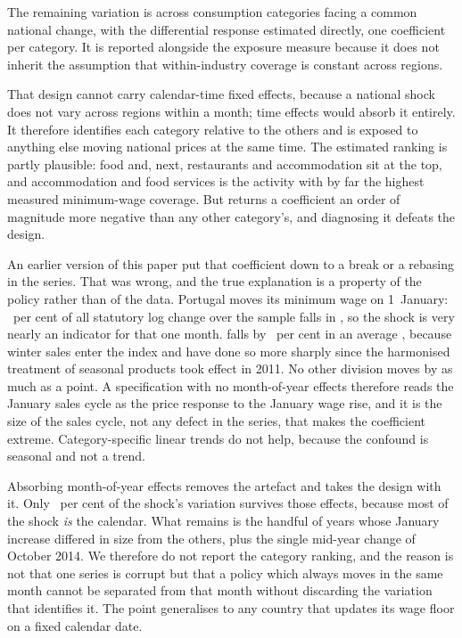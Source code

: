 The remaining variation is across consumption categories facing a common
national change, with the differential response estimated directly, one
coefficient per category. It is reported alongside the exposure measure because
it does not inherit the assumption that within-industry coverage is constant
across regions.

That design cannot carry calendar-time fixed effects, because a national shock
does not vary across regions within a month; time effects would absorb it
entirely. It therefore identifies each category relative to the others and is
exposed to anything else moving national prices at the same time. The estimated
ranking is partly plausible: food and, next, restaurants and accommodation sit
at the top, and accommodation and food services is the activity with by far the
highest measured minimum-wage coverage. But \SeasonalWorstCategory{} returns a
coefficient an order of magnitude more negative than any other category's, and
diagnosing it defeats the design.

An earlier version of this paper put that coefficient down to a break or a
rebasing in the series. That was wrong, and the true explanation is a property
of the policy rather than of the data. Portugal moves its minimum wage on
1~January: \ShockModalSharePct{}~per cent of all statutory log change over the
sample falls in \ShockModalMonth{}, so the shock is very nearly an indicator for
that one month. \SeasonalWorstCategory{} falls by \SeasonalWorstSwingPct{}~per
cent in an average \ShockModalMonth{}, because winter sales enter the index and
have done so more sharply since the harmonised treatment of seasonal products
took effect in 2011. No other division moves by as much as a point. A
specification with no month-of-year effects therefore reads the January sales
cycle as the price response to the January wage rise, and it is the size of the
sales cycle, not any defect in the series, that makes the coefficient extreme.
Category-specific linear trends do not help, because the confound is seasonal
and not a trend.

Absorbing month-of-year effects removes the artefact and takes the design with
it. Only \ShockSurvivingSharePct{}~per cent of the shock's variation survives
those effects, because most of the shock \emph{is} the calendar. What remains is
the handful of years whose January increase differed in size from the others,
plus the single mid-year change of October 2014. We therefore do not report the
category ranking, and the reason is not that one series is corrupt but that a
policy which always moves in the same month cannot be separated from that month
without discarding the variation that identifies it. The point generalises to
any country that updates its wage floor on a fixed calendar date.

